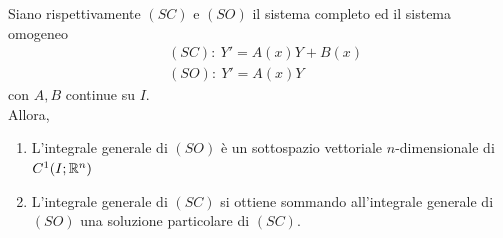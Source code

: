 \begin{theorem} \label{Teo: Struttura dell'integrale generale per i sistemi}
    Siano rispettivamente $(SC)$ e $(SO)$ il sistema completo ed il sistema omogeneo
    \begin{align}
        &(SC):\ Y'=A(x)Y+ B(x)\\
        &(SO):\ Y'=A(x)Y
    \end{align}
    con $A, B$ continue su $I$.\\
    Allora,
    \begin{enumerate}
        \item L'integrale generale di $(SO)$ è un sottospazio vettoriale $n$-dimensionale di $C^1(I; \mathbb{R}^n)$
        \item L'integrale generale di $(SC)$ si ottiene sommando all'integrale generale di $(SO)$ una soluzione particolare di $(SC)$.
    \end{enumerate}
\end{theorem}
